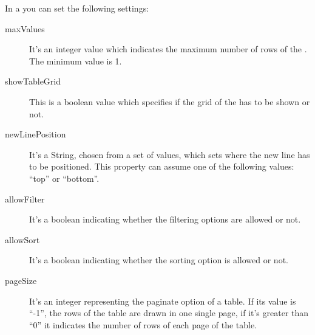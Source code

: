 				In a  you can set the following settings:
				\begin{description}
					\item[maxValues] It's an integer value which indicates the maximum number of rows of the . The minimum value is 1.
					\item[showTableGrid] This is a boolean value which specifies if the grid of the  has to be shown or not.
					\item[newLinePosition] It's a String, chosen from a set of values, which sets where the new line has to be positioned. This property can assume one of the following values: “top” or “bottom”.
					\item[allowFilter] It's a boolean indicating whether the filtering options are allowed or not.
					\item[allowSort] It's a boolean indicating whether the sorting option is allowed or not.
					\item[pageSize] It's an integer representing the paginate option of a table. If its value is “-1”, the rows of the table are drawn in one single page, if it's greater than “0” it indicates the number of rows of each page of the table.
				\end{description}

